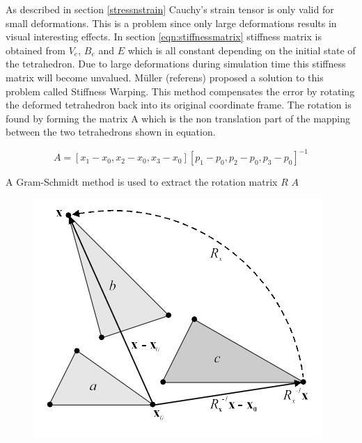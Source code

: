 As described in section \ref{stressnstrain} Cauchy’s strain tensor is only valid for small deformations. This is a problem since only large deformations results in visual interesting effects. In section \ref{eqn:stiffnessmatrix} stiffness matrix is obtained from $V_{e}$, $B_{e}$ and $E$ which is all constant depending on the initial state of the tetrahedron. Due to large deformations during simulation time this stiffness matrix will become unvalued. M\"uller (referens) proposed a solution to this problem called Stiffness Warping. This method compensates the error by rotating the deformed tetrahedron back into its original coordinate frame. The rotation is found by forming the matrix A which is the non translation part of the mapping between the two tetrahedrons shown in equation.

\begin{equation}\label{eqn:stiffnessmatrix}
    A = [x_{1}-x_{0}, x_{2}-x_{0}, x_{3}-x_{0}][p_{1}-p_{0}, p_{2}-p_{0}, p_{3}-p_{0}]^{-1}
\end{equation}

A Gram-Schmidt method is used to extract the rotation matrix $R$  $A$  

\begin{figure}[h]
\centering
\includegraphics[width=.5\columnwidth]{figures/warpedstiffness.png}
\caption{}
\label{fig:4}
\end{figure}